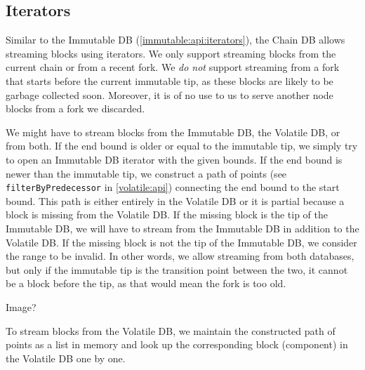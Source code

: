 \subsection{Iterators}
\label{chaindb:union:iterators}

Similar to the Immutable DB (\cref{immutable:api:iterators}), the Chain DB
allows streaming blocks using iterators. We only support streaming blocks from
the current chain or from a recent fork. We \emph{do not} support streaming from
a fork that starts before the current immutable tip, as these blocks are likely
to be garbage collected soon. Moreover, it is of no use to us to serve another
node blocks from a fork we discarded.

We might have to stream blocks from the Immutable DB, the Volatile DB, or from
both. If the end bound is older or equal to the immutable tip, we simply try to
open an Immutable DB iterator with the given bounds. If the end bound is newer
than the immutable tip, we construct a path of points (see
\lstinline!filterByPredecessor! in \cref{volatile:api}) connecting the end bound
to the start bound. This path is either entirely in the Volatile DB or it is
partial because a block is missing from the Volatile DB. If the missing block is
the tip of the Immutable DB, we will have to stream from the Immutable DB in
addition to the Volatile DB. If the missing block is not the tip of the
Immutable DB, we consider the range to be invalid. In other words, we allow
streaming from both databases, but only if the immutable tip is the transition
point between the two, it cannot be a block before the tip, as that would mean
the fork is too old.

 Image?

To stream blocks from the Volatile DB, we maintain the constructed path of
points as a list in memory and look up the corresponding block (component) in
the Volatile DB one by one.

